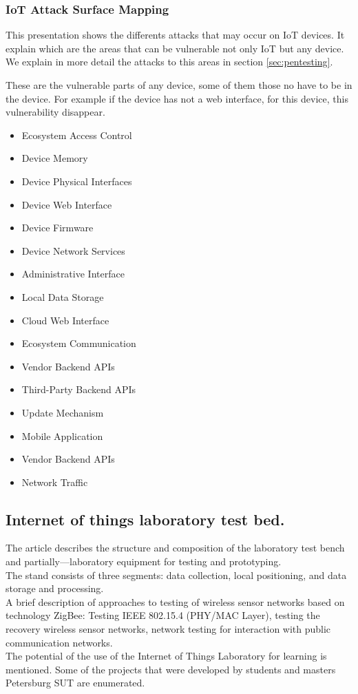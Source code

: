 \subsubsection{IoT Attack Surface Mapping}\cite{Presentation1}
This presentation shows the differents attacks that may occur on IoT devices. It explain which are the areas that can be vulnerable not only IoT but any device. We explain in more detail the attacks to this areas in section \ref{sec:pentesting}.

These are the vulnerable parts of any device, some of them those no have to be in the device. For example if the device has not a web interface, for this device, this vulnerability disappear.
\begin{itemize}
	\item Ecosystem Access Control
	\item Device Memory
	\item Device Physical Interfaces
	\item Device Web Interface
	\item Device Firmware
	\item Device Network Services
	\item Administrative Interface
	\item Local Data Storage
	\item Cloud Web Interface
	\item Ecosystem Communication
	\item Vendor Backend APIs
	\item Third-Party Backend APIs
	\item Update Mechanism
	\item Mobile Application
	\item Vendor Backend APIs
	\item Network Traffic
\end{itemize}

\subsection{Internet of things laboratory test bed.}\cite{Paper12}
The article describes the structure and composition of the laboratory test bench and partially—laboratory equipment for testing and prototyping.\\
The stand consists of three segments: data collection, local positioning, and data storage and processing.\\
A brief description of approaches to testing of wireless sensor networks based on technology ZigBee: Testing IEEE 802.15.4 (PHY/MAC Layer), testing the recovery wireless sensor networks, network testing for interaction with public communication networks.\\
The potential of the use of the Internet of Things Laboratory for learning is mentioned. Some of the projects that were developed by students and masters Petersburg SUT are enumerated.\\


